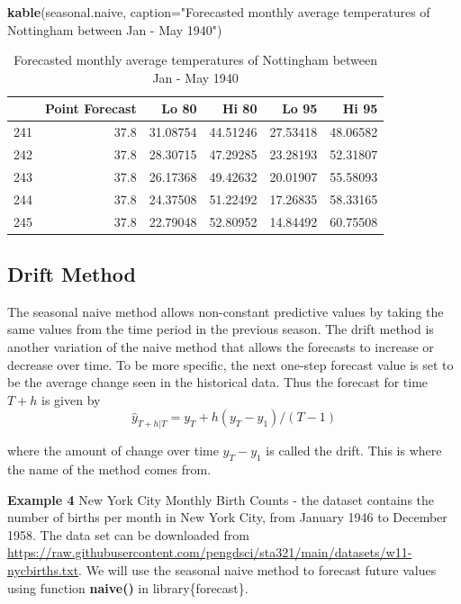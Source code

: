\documentclass[
]{book}
\newenvironment{Shaded}{\begin{snugshade}}{\end{snugshade}}
\newcommand{\AttributeTok}[1]{\textcolor[rgb]{0.13,0.29,0.53}{#1}}
\newcommand{\FunctionTok}[1]{\textcolor[rgb]{0.13,0.29,0.53}{\textbf{#1}}}
\newcommand{\NormalTok}[1]{#1}
\newcommand{\StringTok}[1]{\textcolor[rgb]{0.31,0.60,0.02}{#1}}
\begin{document}
\begin{Shaded}
\begin{Highlighting}[]
\FunctionTok{kable}\NormalTok{(seasonal.naive, }\AttributeTok{caption=}\StringTok{"Forecasted monthly average temperatures of Nottingham between Jan {-} May 1940"}\NormalTok{)}
\end{Highlighting}
\end{Shaded}

\begin{table}

\caption{\label{tab:unnamed-chunk-187}Forecasted monthly average temperatures of Nottingham between Jan - May 1940}
\centering
\begin{tabular}[t]{l|r|r|r|r|r}
\hline
  & Point Forecast & Lo 80 & Hi 80 & Lo 95 & Hi 95\\
\hline
241 & 37.8 & 31.08754 & 44.51246 & 27.53418 & 48.06582\\
\hline
242 & 37.8 & 28.30715 & 47.29285 & 23.28193 & 52.31807\\
\hline
243 & 37.8 & 26.17368 & 49.42632 & 20.01907 & 55.58093\\
\hline
244 & 37.8 & 24.37508 & 51.22492 & 17.26835 & 58.33165\\
\hline
245 & 37.8 & 22.79048 & 52.80952 & 14.84492 & 60.75508\\
\hline
\end{tabular}
\end{table}

\hypertarget{drift-method}{%
\subsection{Drift Method}\label{drift-method}}

The seasonal naive method allows non-constant predictive values by taking the same values from the time period in the previous season. The drift method is another variation of the naive method that allows the forecasts to increase or decrease over time. To be more specific, the next one-step forecast value is set to be the average change seen in the historical data. Thus the forecast for time \(T + h\) is given by \[\hat{y}_{T+h|T} = y_T +h(y_T-y_1)/(T-1)\]

where the amount of change over time \(y_T-y_1\) is called the drift. This is where the name of the method comes from.

\textbf{Example 4} New York City Monthly Birth Counts - the dataset contains the number of births per month in New York City, from January 1946 to December 1958. The data set can be downloaded from \url{https://raw.githubusercontent.com/pengdsci/sta321/main/datasets/w11-nycbirths.txt}. We will use the seasonal naive method to forecast future values using function \textbf{naive()} in library\{forecast\}.
\end{document}
